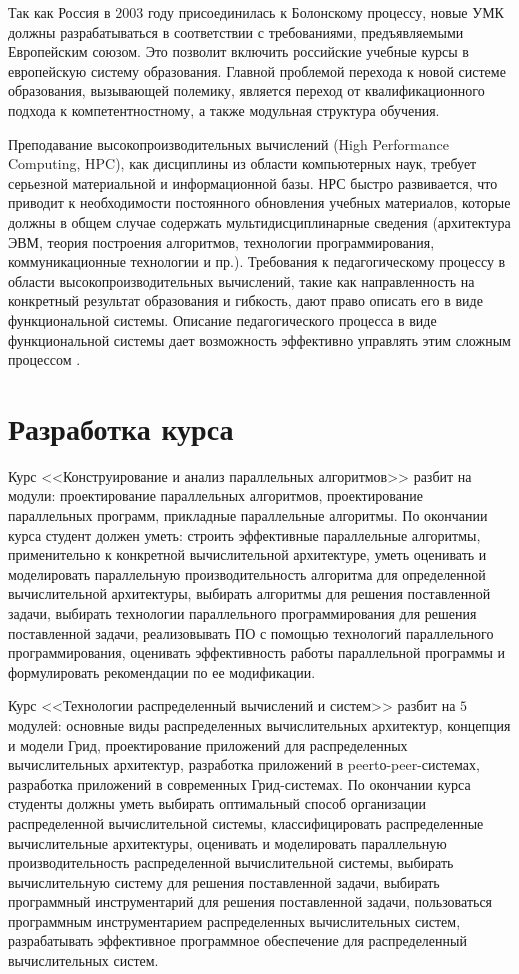 \documentclass[a4paper,11pt]{article} %
\begin{document}
	Так как Россия в $2003$ году присоединилась к Болонскому процессу, новые УМК должны разрабатываться в соответствии с требованиями, предъявляемыми Европейским союзом. Это позволит включить российские учебные курсы в европейскую систему образования. Главной проблемой
	перехода к новой системе образования, вызывающей полемику, является переход от квалификационного подхода к компетентностному, а также модульная структура обучения.
	
	Преподавание высокопроизводительных вычислений (High Performance Computing, HPC), как
	дисциплины из области компьютерных наук, требует серьезной материальной и информационной
	базы. НРС быстро развивается, что приводит к необходимости постоянного обновления учебных
	материалов, которые должны в общем случае содержать мультидисциплинарные сведения (архитектура ЭВМ, теория построения алгоритмов, технологии программирования, коммуникационные технологии и пр.). Требования к педагогическому процессу в области высокопроизводительных вычислений, такие как направленность на конкретный результат образования и гибкость,
	дают право описать его в виде функциональной системы. Описание педагогического процесса в
	виде функциональной системы дает возможность эффективно управлять этим сложным процессом \cite{third}.
	
	\section{Разработка курса}
	Курс <<Конструирование и анализ параллельных алгоритмов>> разбит на модули: проектирование
	параллельных алгоритмов, проектирование параллельных программ, прикладные параллельные
	алгоритмы. По окончании курса студент должен уметь: строить эффективные параллельные 
	алгоритмы, применительно к конкретной вычислительной архитектуре, уметь оценивать и моделировать параллельную производительность алгоритма для определенной вычислительной архитектуры, выбирать алгоритмы для решения поставленной задачи, выбирать технологии параллельного программирования для решения поставленной задачи, реализовывать ПО с помощью
	технологий параллельного программирования, оценивать эффективность работы параллельной
	программы и формулировать рекомендации по ее модификации.
	
	Курс <<Технологии распределенный вычислений и систем>> разбит на $5$ модулей: основные виды распределенных вычислительных архитектур, концепция и модели Грид, проектирование приложений для распределенных вычислительных архитектур, разработка приложений в peertо-peer-системах, разработка приложений в современных Грид-системах. По окончании курса студенты должны уметь выбирать оптимальный способ организации распределенной вычислительной системы, классифицировать распределенные вычислительные архитектуры, оценивать и моделировать параллельную производительность распределенной вычислительной системы, выбирать вычислительную систему для решения поставленной задачи, выбирать программный инструментарий для решения поставленной задачи, пользоваться программным инструментарием распределенных вычислительных систем, разрабатывать эффективное программное обеспечение для распределенный вычислительных систем.
	
\end{document}
